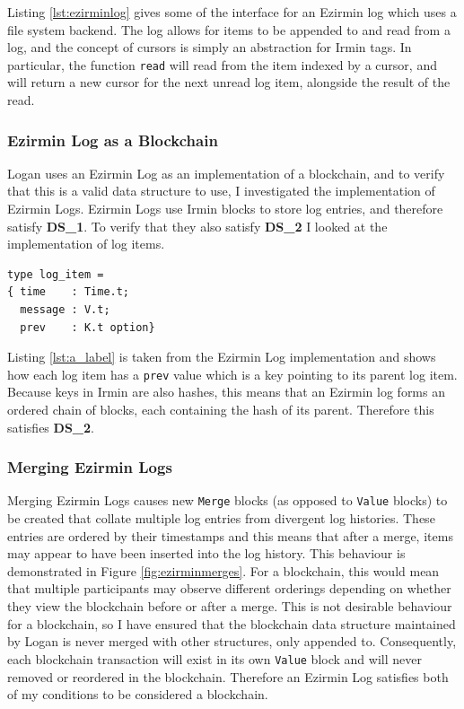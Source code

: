 \documentclass[12pt,a4paper,twoside,openright]{report}
\begin{document}
	Listing \ref{lst:ezirminlog} gives some of the interface for an Ezirmin log which uses a file system backend.
	The log allows for items to be appended to and read from a log, and the concept of cursors is simply an abstraction for Irmin tags.
	In particular, the function \texttt{read} will read from the item indexed by a cursor, and will return a new cursor for the next unread log item, alongside the result of the read.

	\subsubsection*{Ezirmin Log as a Blockchain}
	Logan uses an Ezirmin Log as an implementation of a blockchain, and to verify that this is a valid data structure to use, I investigated the implementation of Ezirmin Logs.
	Ezirmin Logs use Irmin blocks to store log entries, and therefore satisfy \textbf{DS\_1}. 
	To verify that they also satisfy \textbf{DS\_2} I looked at the implementation of log items.

	\begin{lstlisting}[caption={Ezirmin Log Item},label={lst:a_label}]
type log_item =
{ time    : Time.t;
  message : V.t;
  prev    : K.t option}
	\end{lstlisting}

	Listing \ref{lst:a_label} is taken from the Ezirmin Log implementation and shows how each log item has a \texttt{prev} value which is a key pointing to its parent log item. 
	Because keys in Irmin are also hashes, this means that an Ezirmin log forms an ordered chain of blocks, each containing the hash of its parent. 
	Therefore this satisfies \textbf{DS\_2}.

	\subsubsection*{Merging Ezirmin Logs}
	Merging Ezirmin Logs causes new \texttt{Merge} blocks (as opposed to \texttt{Value} blocks) to be created that collate multiple log entries from divergent log histories.
	These entries are ordered by their timestamps and this means that after a merge, items may appear to have been inserted into the log history.
	This behaviour is demonstrated in Figure \ref{fig:ezirminmerges}.
	For a blockchain, this would mean that multiple participants may observe different orderings depending on whether they view the blockchain before or after a merge.
	This is not desirable behaviour for a blockchain, so I have ensured that the blockchain data structure maintained by Logan is never merged with other structures, only appended to. 
	Consequently, each blockchain transaction will exist in its own \texttt{Value} block and will never removed or reordered in the blockchain.
	Therefore an Ezirmin Log satisfies both of my conditions to be considered a blockchain.
\end{document}
